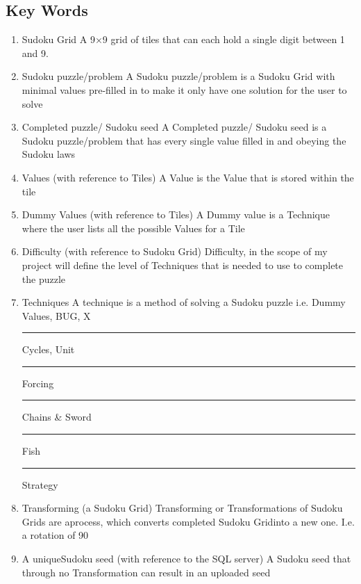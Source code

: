 \documentclass[fleqn]{article}
\newcommand{\TextUnderscore}{\rule{.4em}{.4pt}}
\begin{document}
\subsection{Key Words}
\begin{enumerate}
\item Sudoku Grid
A 9×9 grid of tiles that can each hold a single digit between 1 and 9. 
\item Sudoku puzzle/problem
A Sudoku puzzle/problem is a Sudoku Grid with minimal values pre-filled in to make it only have one solution for the user to solve
\item Completed puzzle/ Sudoku seed
A Completed puzzle/ Sudoku seed is a Sudoku puzzle/problem that has every single value filled in and obeying the Sudoku laws
\item Values (with reference to Tiles)
A Value is the Value that is stored within the tile
\item Dummy Values (with reference to Tiles)
A Dummy value is a Technique where the user lists all the possible Values for a Tile 
\item Difficulty (with reference to Sudoku Grid)
Difficulty, in the scope of my project will define the level of Techniques that is needed to use to complete the puzzle 
\item Techniques
A technique is a method of solving a Sudoku puzzle i.e. Dummy Values, BUG, X\TextUnderscore Cycles, Unit\TextUnderscore Forcing\TextUnderscore Chains \& Sword\TextUnderscore Fish\TextUnderscore Strategy
\item Transforming (a Sudoku Grid)
Transforming or Transformations of Sudoku Grids are aprocess, which converts completed Sudoku Gridinto a new one. I.e. a rotation of 90\textdegree
\item A uniqueSudoku seed (with reference to the SQL server)
A Sudoku seed that through no Transformation can result in an uploaded seed
\end{enumerate}
\end{document}
